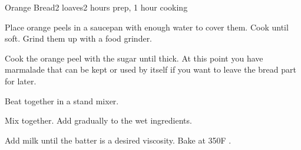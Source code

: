 \documentclass[../Cookbook.tex]{subfiles}
\begin{document}
\begin{recipe}{Orange Bread}{2 loaves}{2 hours prep, 1 hour cooking}

Place orange peels in a saucepan with enough water to cover them. Cook until soft. Grind them up with a food grinder.

Cook the orange peel with the sugar until thick. At this point you have marmalade that can be kept or used by itself if you want to leave the bread part for later.

Beat together in a stand mixer.

Mix together. Add gradually to the wet ingredients.

Add milk until the batter is a desired viscosity.
Bake at 350\0F .

\end{recipe}
\end{document}
